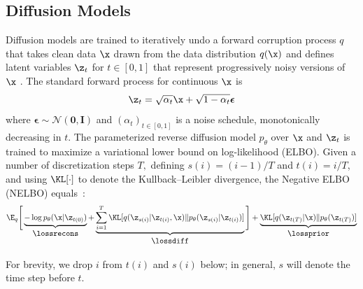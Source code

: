 \documentclass{article} %
\begin{document}
\subsection{Diffusion Models}\label{subsec:background_diffusion}
Diffusion models are trained to iteratively undo a forward corruption process $q$ that takes clean data $\x$ drawn from the data distribution $q(\x)$ and defines latent variables $\z_t$ for $t \in [0, 1]$  that represent progressively noisy versions of $\x$ \citep{ho2020denoising, sohl2015deep, song2020score, wang2023infodiffusion,sahoo2023mulan,gokaslan2024commoncanvas}.
The standard forward process for continuous $\x$ is
\begin{equation}\label{eqn:ddpm_maginal}
    \z_t = \sqrt{\alpha_t}  \x + \sqrt{1 - \alpha_t}  \boldsymbol\epsilon
\end{equation}
where $\boldsymbol\epsilon \sim \mathcal{N}(\mathbf{0}, \mathbf{I})$ and $(\alpha_t)_{t \in [0,1]}$ is a noise schedule, monotonically decreasing in $t$.
The parameterized reverse diffusion model $p_\theta$ over $\x$ and $\z_t$ is trained to maximize a variational lower bound on log-likelihood (ELBO).
Given a number of discretization steps $T,$ defining $s(i) = (i -1)/T$ and $ t(i) = i /T$, and using $\KL[\cdot]$ to denote the Kullback–Leibler divergence,
the Negative ELBO (NELBO) equals~\citep{sohl2015deep}:
{\footnotesize
\begin{align}\label{eqn:elbo}
    \E_q\Bigg[\underbrace{- \log p_\theta(
    \x | \z_{t(0)})}_{\normalsize
    \begin{array}{c}\lossrecons\end{array}} + \underbrace{\sum_{i=1}^T \KL[q(\z_{s(i)} | \z_{t(i)}, \x) \| p_\theta(\z_{s(i)} | \z_{t(i)})]}_{\normalsize
    \begin{array}{c}\lossdiff\end{array}}\Bigg]
    + \underbrace{\KL[q(\z_{t(T)} | \x) \| p_\theta(\z_{t(T)})]}_{\normalsize
    \begin{array}{c}\lossprior\end{array}}
\end{align}
}

For brevity, we drop $i$ from $t(i)$ and $s(i)$ below; in general, $s$ will denote the time step before $t$.
\end{document}

